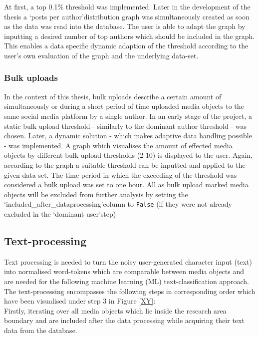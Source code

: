 At first, a top 0.1\% threshold was implemented. Later in the development of the thesis a \lq posts per author\rq distribution graph was simultaneously created as soon as the data was read into the database. The user is able to adapt the graph by inputting a desired number of top authors which should be included in the graph. This enables a data specific dynamic adaption of the threshold according to the user\rq s own evaluation of the graph and the underlying data-set.

\subsubsection{Bulk uploads} \label{bias_bulk_uploads}
In the context of this thesis, bulk uploads describe a certain amount of simultaneously or during a short period of time uploaded media objects to the same social media platform by a single author. In an early stage of the project, a static bulk upload threshold - similarly to the dominant author threshold - was chosen. Later, a dynamic solution - which makes adaptive data handling possible - was implemented. A graph which visualises the amount of effected media objects by different bulk upload thresholds (2-10) is displayed to the user. Again, according to the graph a suitable threshold can be inputted and applied to the given data-set. The time period in which the exceeding of the threshold was considered a bulk upload was set to one hour. 
All as bulk upload marked media objects will be excluded from further analysis by setting the \lq included\_after\_dataprocessing\rq column to \texttt{False} (if they were not already excluded in the \lq dominant user\rq step)

\subsection{Text-processing} \label{text_processing}
Text processing is needed to turn the noisy user-generated character input (text) into normalised word-tokens which are comparable between media objects and are needed for the following machine learning (ML) text-classification approach. The text-processing encompasses the following steps in corresponding order which have been visualised under step 3 in Figure \ref{XY}:\\
Firstly, iterating over all media objects which lie inside the research area boundary and are included after the data processing while acquiring their text data from the database.

